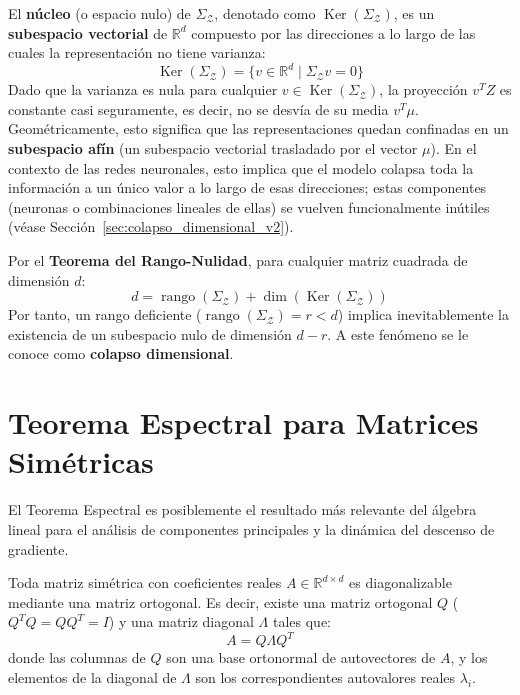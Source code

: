 El \textbf{núcleo} (o espacio nulo) de $\Sigma_\mathcal{Z}$, denotado como $\operatorname{Ker}(\Sigma_\mathcal{Z})$, es un \textbf{subespacio vectorial} de $\mathbb{R}^d$ compuesto por las direcciones a lo largo de las cuales la representación no tiene varianza:
\begin{equation}
    \operatorname{Ker}(\Sigma_\mathcal{Z}) = \{ v \in \mathbb{R}^d \mid \Sigma_\mathcal{Z} v = 0 \}
\end{equation}
Dado que la varianza es nula para cualquier $v \in \operatorname{Ker}(\Sigma_\mathcal{Z})$, la proyección $v^T Z$ es constante casi seguramente, es decir, no se desvía de su media $v^T \mu$. Geométricamente, esto significa que las representaciones quedan confinadas en un \textbf{subespacio afín} (un subespacio vectorial trasladado por el vector $\mu$). En el contexto de las redes neuronales, esto implica que el modelo colapsa toda la información a un único valor a lo largo de esas direcciones; estas componentes (neuronas o combinaciones lineales de ellas) se vuelven funcionalmente inútiles (véase Sección~\ref{sec:colapso_dimensional_v2}).

Por el \textbf{Teorema del Rango-Nulidad}, para cualquier matriz cuadrada de dimensión $d$:
\begin{equation}
    d = \operatorname{rango}(\Sigma_\mathcal{Z}) + \dim(\operatorname{Ker}(\Sigma_\mathcal{Z}))
\end{equation}
Por tanto, un rango deficiente ($\operatorname{rango}(\Sigma_\mathcal{Z}) = r < d$) implica inevitablemente la existencia de un subespacio nulo de dimensión $d-r$. A este fenómeno se le conoce como \textbf{colapso dimensional}.

\section{Teorema Espectral para Matrices Simétricas}
\label{sec:al_teorema_espectral}

El Teorema Espectral es posiblemente el resultado más relevante del álgebra lineal para el análisis de componentes principales y la dinámica del descenso de gradiente.

\begin{theorem}
Toda matriz simétrica con coeficientes reales $A \in \mathbb{R}^{d \times d}$ es diagonalizable mediante una matriz ortogonal. Es decir, existe una matriz ortogonal $Q$ ($Q^TQ = QQ^T = I$) y una matriz diagonal $\Lambda$ tales que:
\begin{equation}
    A = Q \Lambda Q^T
\end{equation}
donde las columnas de $Q$ son una base ortonormal de autovectores de $A$, y los elementos de la diagonal de $\Lambda$ son los correspondientes autovalores reales $\lambda_i$.
\end{theorem}

